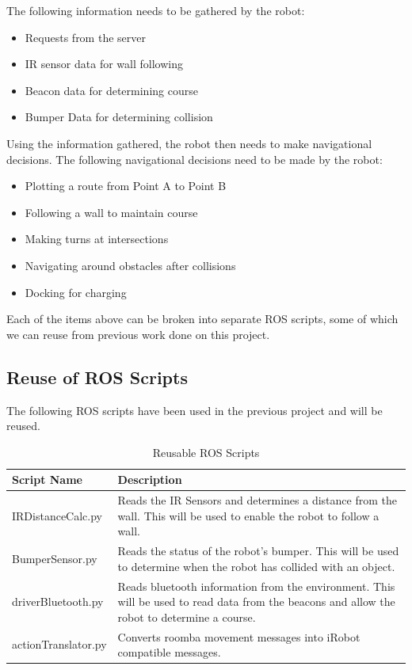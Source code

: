 \documentclass[12pt]{report}
\begin{document}
The following information needs to be gathered by the robot:
\begin{itemize}
\itemsep0em 
\item Requests from the server
\item IR sensor data for wall following
\item Beacon data for determining course
\item Bumper Data for determining collision
\end{itemize}

Using the information gathered, the robot then needs to make navigational decisions. The following navigational decisions need to be made by the robot:
\begin{itemize}
\itemsep0em 
\item Plotting a route from Point A to Point B
\item Following a wall to maintain course
\item Making turns at intersections
\item Navigating around obstacles after collisions
\item Docking for charging
\end{itemize}

Each of the items above can be broken into separate ROS scripts, some of which we can reuse from previous work done on this project.
\subsection{Reuse of ROS Scripts}
The following ROS scripts have been used in the previous project and will be reused.
\begin{table}[H]
\centering
\caption{Reusable ROS Scripts}
\centering
\begin{tabular} { | p{4cm} | p{8cm} | }
\hline
Script Name & Description \\
\hline
IRDistanceCalc.py & Reads the IR Sensors and determines a distance from the wall. This will be used to enable the robot to follow a wall. \\
\hline
BumperSensor.py & Reads the status of the robot's bumper. This will be used to determine when the robot has collided with an object. \\
\hline
driverBluetooth.py & Reads bluetooth information from the environment. This will be used to read data from the beacons and allow the robot to determine a course. \\
\hline
actionTranslator.py & Converts roomba movement messages into iRobot compatible messages. \\
\hline
\end{tabular}
\end{table}%
\end{document}
